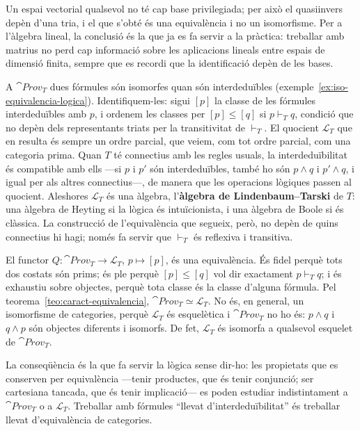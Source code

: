 \begin{exemple}
\begin{itemize}
\end{itemize}
Un espai vectorial qualsevol no té cap base privilegiada; per això el quasiinvers depèn d'una tria, i el que s'obté és una equivalència i no un isomorfisme. Per a l'àlgebra lineal, la conclusió és la que ja es fa servir a la pràctica: treballar amb matrius no perd cap informació sobre les aplicacions lineals entre espais de dimensió finita, sempre que es recordi que la identificació depèn de les bases.
\end{exemple}

\begin{exemple}\label{ex:prov-lindenbaum}
A $\cat{Prov}_T$ dues fórmules són isomorfes quan són interdeduïbles (exemple~\ref{ex:iso-equivalencia-logica}). Identifiquem-les: sigui $[p]$ la classe de les fórmules interdeduïbles amb $p$, i ordenem les classes per $[p]\leq[q]$ si $p\vdash_T q$, condició que no depèn dels representants triats per la transitivitat de $\vdash_T$. El quocient $\mathcal L_T$ que en resulta és sempre un ordre parcial, que veiem, com tot ordre parcial, com una categoria prima. Quan $T$ té connectius amb les regles usuals, la interdeduïbilitat és compatible amb ells ---si $p$ i $p'$ són interdeduïbles, també ho són $p\land q$ i $p'\land q$, i igual per als altres connectius---, de manera que les operacions lògiques passen al quocient. Aleshores $\mathcal L_T$ és una àlgebra, l'\textbf{àlgebra de Lindenbaum--Tarski} de $T$: una àlgebra de Heyting si la lògica és intuïcionista, i una àlgebra de Boole si és clàssica. La construcció de l'equivalència que segueix, però, no depèn de quins connectius hi hagi; només fa servir que $\vdash_T$ és reflexiva i transitiva.

El functor $Q\colon\cat{Prov}_T\to\mathcal L_T$, $p\mapsto[p]$, és una equivalència. És fidel perquè tots dos costats són prims; és ple perquè $[p]\leq[q]$ vol dir exactament $p\vdash_T q$; i és exhaustiu sobre objectes, perquè tota classe és la classe d'alguna fórmula. Pel teorema~\ref{teo:caract-equivalencia}, $\cat{Prov}_T\simeq\mathcal L_T$. No és, en general, un isomorfisme de categories, perquè $\mathcal L_T$ és esquelètica i $\cat{Prov}_T$ no ho és: $p\land q$ i $q\land p$ són objectes diferents i isomorfs. De fet, $\mathcal L_T$ és isomorfa a qualsevol esquelet de $\cat{Prov}_T$.

La conseqüència és la que fa servir la lògica sense dir-ho: les propietats que es conserven per equivalència ---tenir productes, que és tenir conjunció; ser cartesiana tancada, que és tenir implicació--- es poden estudiar indistintament a $\cat{Prov}_T$ o a $\mathcal L_T$. Treballar amb fórmules \enquote{llevat d'interdeduïbilitat} és treballar llevat d'equivalència de categories.
\end{exemple}

